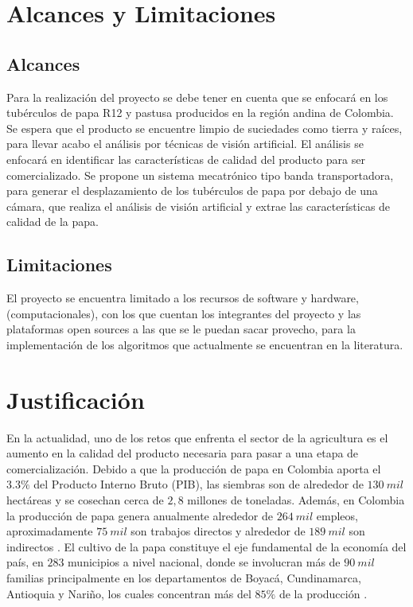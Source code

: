 \section{Alcances y Limitaciones}

\subsection{Alcances}

Para la realización del proyecto se debe tener en cuenta que se enfocará en los tubérculos de papa R12 y pastusa producidos en la región andina de Colombia. Se espera que el producto se encuentre limpio de suciedades como tierra y raíces, para llevar acabo el análisis por técnicas de visión artificial. El análisis se enfocará en identificar las características de calidad del producto para ser comercializado. Se propone un sistema mecatrónico tipo banda transportadora, para generar el desplazamiento de los tubérculos de papa por debajo de una cámara, que realiza el análisis de visión artificial y extrae las características de calidad de la papa.  

\subsection{Limitaciones}


El proyecto se encuentra limitado a los recursos de software y hardware, (computacionales), con los que cuentan los integrantes del proyecto y las plataformas open sources a las que se le puedan sacar provecho, para la implementación de los algoritmos que actualmente se encuentran en la literatura.

\section{Justificación}

En la actualidad, uno de los retos que enfrenta el sector de la agricultura es el aumento en la calidad del producto necesaria para pasar a una etapa de comercialización. Debido a que la producción de papa en Colombia aporta el $3.3 \%$ del Producto Interno Bruto (PIB), las siembras son de alrededor de $130 \ mil$ hectáreas y se cosechan cerca de $2,8$ millones de toneladas. Además, en Colombia la producción de papa genera anualmente alrededor de $264 \ mil$ empleos, aproximadamente $75 \ mil$ son trabajos directos y alrededor de $189 \ mil$ son indirectos \cite{referencia2}. El cultivo de la papa constituye el eje fundamental de la economía del país, en $283$ municipios a nivel nacional, donde se involucran más de $90 \ mil$ familias principalmente en los departamentos de Boyacá, Cundinamarca, Antioquia y Nariño, los cuales concentran más del $85 \%$ de la producción \cite{referencia1}.\\
 
